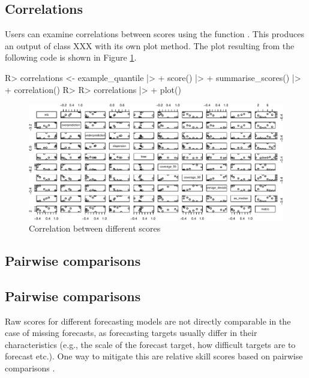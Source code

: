 \documentclass[
]{jss}
\begin{document}
\subsection{Correlations}\label{correlations}

Users can examine correlations between scores using the function
. This produces an output of class XXX with its own
plot method. The plot resulting from the following code is shown in
Figure \ref{fig:correlation-plot}.

\begin{CodeChunk}
\begin{CodeInput}
R> correlations <- example_quantile |>
+   score() |>
+   summarise_scores() |>
+   correlation()
R> 
R> correlations |>
+   plot()
\end{CodeInput}
\begin{figure}[!h]

{\centering \includegraphics[width=1\linewidth]{manuscript_files/figure-latex/correlation-plot-1} 

}

\caption[Correlation between different scores]{Correlation between different scores}\label{fig:correlation-plot}
\end{figure}
\end{CodeChunk}

\subsection{Pairwise comparisons}\label{pairwise-comparisons}

\subsection{Pairwise comparisons}\label{pairwisetheory}

Raw scores for different forecasting models are not directly comparable
in the case of missing forecasts, as forecasting targets usually differ
in their characteristics (e.g., the scale of the forecast target, how
difficult targets are to forecast etc.). One way to mitigate this are
relative skill scores based on pairwise comparisons
\citep{cramerEvaluationIndividualEnsemble2021}.
\end{document}
